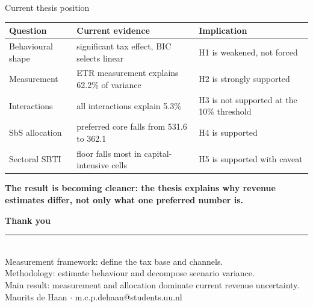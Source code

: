 \documentclass[aspectratio=169, 11pt]{beamer}
\newcommand{\highlight}[1]{\textcolor{DkOrange}{\textbf{#1}}}
\begin{document}
\begin{frame}{Current thesis position}
\begin{center}
\small
\begin{tabular}{@{}L{2.1cm}L{4.3cm}L{4.9cm}@{}}
  \toprule
  \textbf{Question} & \textbf{Current evidence} & \textbf{Implication} \\
  \midrule
  Behavioural shape & significant tax effect, BIC selects linear & H1 is weakened, not forced \\
  Measurement & ETR measurement explains 62.2\% of variance & H2 is strongly supported \\
  Interactions & all interactions explain 5.3\% & H3 is not supported at the 10\% threshold \\
  SbS allocation & preferred core falls from 531.6 to 362.1 & H4 is supported \\
  Sectoral SBTI & floor falls most in capital-intensive cells & H5 is supported with caveat \\
  \bottomrule
\end{tabular}
\end{center}

\vspace{0.5em}
\centering
\highlight{The result is becoming cleaner: the thesis explains why revenue estimates differ, not only what one preferred number is.}
\end{frame}

{
\begin{frame}[plain]
  \vspace{1.5em}
  \begin{center}
    {\color{Ivory}\Large\bfseries Thank you}\\[1.2em]
    {\color{DkOrange}\rule{4cm}{2pt}}\\[1.2em]
    {\color{WarmGrey}\normalsize Measurement framework: define the tax base and channels.}\\[0.45em]
    {\color{LtOrange}\normalsize Methodology: estimate behaviour and decompose scenario variance.}\\[0.45em]
    {\color{WarmGrey}\normalsize Main result: measurement and allocation dominate current revenue uncertainty.}\\[1.2em]
    {\color{MidGrey}\small Maurits de Haan $\cdot$ m.c.p.dehaan@students.uu.nl}
  \end{center}
\end{frame}
}
\end{document}
